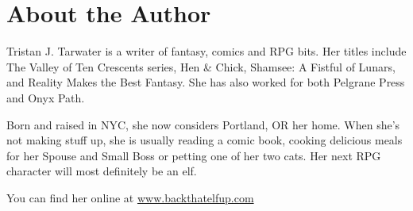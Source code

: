 \section{About the Author}\label{about-the-author}

Tristan J. Tarwater is a writer of fantasy, comics and RPG bits. Her
titles include The Valley of Ten Crescents series, Hen \& Chick,
Shamsee: A Fistful of Lunars, and Reality Makes the Best Fantasy. She
has also worked for both Pelgrane Press and Onyx Path.

Born and raised in NYC, she now considers Portland, OR her home. When
she's not making stuff up, she is usually reading a comic book, cooking
delicious meals for her Spouse and Small Boss or petting one of her two
cats. Her next RPG character will most definitely be an elf.

You can find her online at
\href{https://www.backthatelfup.com}{www.backthatelfup.com}
